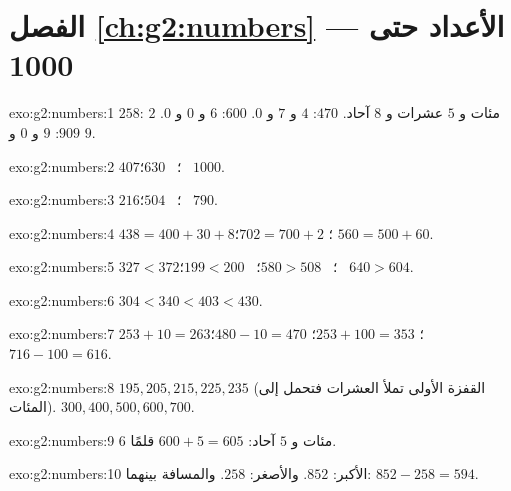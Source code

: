\section*{الفصل \ref{ch:g2:numbers} --- الأعداد حتى 1000}

\begin{solution}{exo:g2:numbers:1}
$258$: $2$ مئات و $5$ عشرات و $8$ آحاد. $470$: $4$ و $7$ و $0$.
$600$: $6$ و $0$ و $0$. $909$: $9$ و $0$ و $9$.
\end{solution}

\begin{solution}{exo:g2:numbers:2}
$407$؛ \ $630$؛ \ $1000$.
\end{solution}

\begin{solution}{exo:g2:numbers:3}
$216$؛ \ $504$؛ \ $790$.
\end{solution}

\begin{solution}{exo:g2:numbers:4}
$438 = 400 + 30 + 8$؛ \quad $702 = 700 + 2$؛ \quad
$560 = 500 + 60$.
\end{solution}

\begin{solution}{exo:g2:numbers:5}
$327 < 372$؛ \ $580 > 508$؛ \ $199 < 200$؛ \ $640 > 604$.
\end{solution}

\begin{solution}{exo:g2:numbers:6}
$304 < 340 < 403 < 430$.
\end{solution}

\begin{solution}{exo:g2:numbers:7}
$253 + 10 = 263$؛ \quad $253 + 100 = 353$؛ \quad
$480 - 10 = 470$؛ \quad $716 - 100 = 616$.
\end{solution}

\begin{solution}{exo:g2:numbers:8}
$195, 205, 215, 225, 235$ (القفزة الأولى تملأ العشرات
فتحمل إلى المئات). $300, 400, 500, 600, 700$.
\end{solution}

\begin{solution}{exo:g2:numbers:9}
$6$ مئات و $5$ آحاد: $600 + 5 = 605$ قلمًا.
\end{solution}

\begin{solution}{exo:g2:numbers:10}
الأكبر: $852$. والأصغر: $258$. والمسافة بينهما:
$852 - 258 = 594$.
\end{solution}

